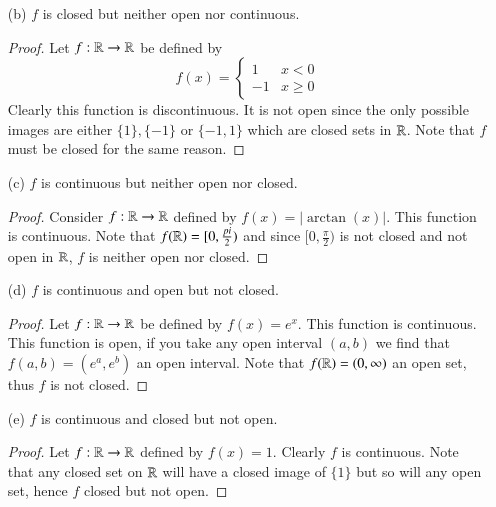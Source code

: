 \documentclass[minion]{homework651}
\begin{document}
\begin{problems}
\begin{enumerate}
    \item[(b)] $f$ is closed but neither open nor continuous. 
    \begin{proof} Let $f: \mathbb R \to \mathbb R$ be defined by 
        \begin{equation*}
            f(x) = \begin{cases} 
                1 & x < 0\\
                -1 & x \geq 0
             \end{cases}
        \end{equation*} 
        Clearly this function is discontinuous. It is not open since the only possible images are either $\{1\}, \{-1\}$ or $\{-1,1\}$ which are closed 
        sets in $\mathbb R$. Note that $f$ must be closed for the same reason. 
    \end{proof}

    \item[(c)] $f$ is continuous but neither open nor closed. 
    \begin{proof} Consider $f: \mathbb R \to \mathbb R$ defined by $f(x) = |\arctan(x)|$. This function is continuous. Note that $f(\mathbb R) = [0, \frac{pi}{2})$ 
        and since $[0, \frac{\pi}{2})$ is not closed and not open in $\mathbb R$, $f$ is neither open nor closed.
    \end{proof}


    \item[(d)] $f$ is continuous and open but not closed. 
    \begin{proof} Let $f: \mathbb R \to \mathbb R$ be defined by $f(x) = e^x$. This function is continuous. This function is open, 
        if you take any open interval $(a, b)$ we find that $f(a, b) = (e^a, e^b)$ an open interval. Note that $f(\mathbb R) = (0, \infty)$ 
        an open set, thus $f$ is not closed. 
    \end{proof}

    \item[(e)] $f$ is continuous and closed but not open. 
    \begin{proof} Let $f: \mathbb R \to \mathbb R$ defined by $f(x) = 1$. Clearly $f$ is continuous. Note that any closed set on $\mathbb R$ will have a 
        closed image of $\{1\}$ but so will any open set, hence $f$ closed but not open. 
    \end{proof}


\end{enumerate}
\end{problems}
\end{document}
